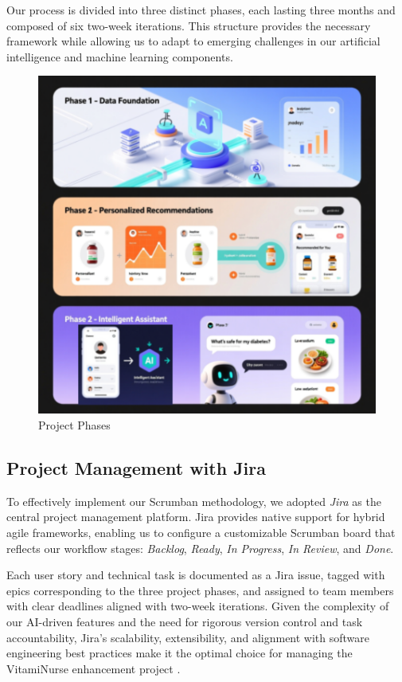 Our process is divided into three distinct phases, each lasting three months and composed of six two-week iterations.
This structure provides the necessary framework while allowing us to adapt to emerging challenges in our artificial intelligence and machine learning components. 
\begin{figure}[H]
\centering
\includegraphics[scale=0.72]{images/planning.png}
\caption{Project Phases}
\label{fig:project_timeline}
\end{figure}

\subsection{Project Management with Jira}

To effectively implement our Scrumban methodology, we adopted \textit{Jira} as the central project management platform. Jira provides native support for hybrid agile frameworks, enabling us to configure a customizable Scrumban board that reflects our workflow stages: \textit{Backlog}, \textit{Ready}, \textit{In Progress}, \textit{In Review}, and \textit{Done}. 

Each user story and technical task is documented as a Jira issue, tagged with epics corresponding to the three project phases, and assigned to team members with clear deadlines aligned with two-week iterations.
Given the complexity of our AI-driven features and the need for rigorous version control and task accountability, Jira’s scalability, extensibility, and alignment with software engineering best practices make it the optimal choice for managing the VitamiNurse enhancement project \cite{atlassian2023jira}.


